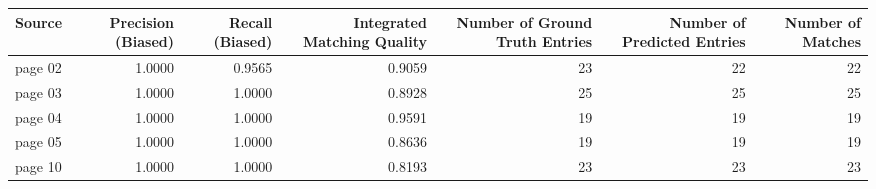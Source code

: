\begin{tabular}{lrrrrrr}
\toprule
Source & Precision (Biased) & Recall (Biased) & Integrated Matching Quality & Number of Ground Truth Entries & Number of Predicted Entries & Number of Matches \\
\midrule
page 02 & 1.0000 & 0.9565 & 0.9059 & 23 & 22 & 22 \\
page 03 & 1.0000 & 1.0000 & 0.8928 & 25 & 25 & 25 \\
page 04 & 1.0000 & 1.0000 & 0.9591 & 19 & 19 & 19 \\
page 05 & 1.0000 & 1.0000 & 0.8636 & 19 & 19 & 19 \\
page 10 & 1.0000 & 1.0000 & 0.8193 & 23 & 23 & 23 \\
\bottomrule
\end{tabular}
